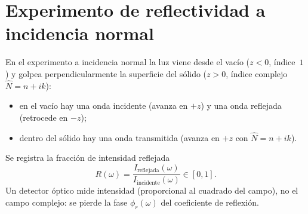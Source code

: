 \section{Experimento de reflectividad a incidencia normal}

En el experimento a incidencia normal la luz viene desde el vac\'io ($z<0$, \'indice~$1$)
y golpea perpendicularmente la superficie del s\'olido ($z>0$, \'indice complejo $\hat N=n+ik$):
\begin{itemize}[leftmargin=*]
\item en el vac\'io hay una onda incidente (avanza en $+z$) y una onda reflejada (retrocede en $-z$);
\item dentro del s\'olido hay una onda transmitida (avanza en $+z$ con $\hat N=n+ik$).
\end{itemize}
Se registra la fracci\'on de intensidad reflejada
\begin{equation}
R(\omega)=\frac{I_{\mathrm{reflejada}}(\omega)}{I_{\mathrm{incidente}}(\omega)}\in[0,1].
\end{equation}
Un detector \'optico mide intensidad (proporcional al cuadrado del campo), no el campo complejo:
se pierde la fase $\phi_r(\omega)$ del coeficiente de reflexi\'on.

